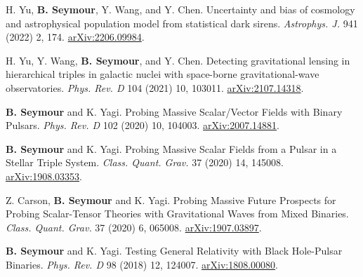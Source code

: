 \begin{cvpublications}
    \cvpublication
        {H. Yu, \textbf{B. Seymour}, Y. Wang, and Y. Chen. Uncertainty and bias of cosmology and astrophysical population model from statistical dark sirens.
        \textit{Astrophys. J.} 941 (2022) 2, 174.
        \href{https://arxiv.org/abs/2206.09984}{arXiv:2206.09984}.
        } %

    

\end{cvpublications}
\begin{cvpublications}
        \cvpublication
        {H. Yu, Y. Wang, \textbf{B. Seymour}, and Y. Chen. Detecting gravitational lensing in hierarchical triples in galactic nuclei with space-borne gravitational-wave observatories.
        \textit{Phys. Rev. D} 104 (2021) 10, 103011.
        \href{https://arxiv.org/abs/2107.14318}{arXiv:2107.14318}.
        } %

    \cvpublication
        {\textbf{B. Seymour} and K. Yagi. Probing Massive Scalar/Vector Fields with Binary Pulsars.
        \textit{Phys. Rev. D} 102 (2020) 10, 104003.
        \href{https://arxiv.org/abs/2007.14881}{arXiv:2007.14881}.
        } %
        

  \cvpublication
    {\textbf{B. Seymour} and K. Yagi. Probing Massive Scalar Fields from a Pulsar in a Stellar Triple System.
    \textit{Class. Quant. Grav.} 37 (2020) 14, 145008.
    \href{https://arxiv.org/abs/1908.03353}{arXiv:1908.03353}. } %
    
  \cvpublication
    {Z. Carson, \textbf{B. Seymour} and K. Yagi. Probing Massive Future Prospects for Probing Scalar-Tensor Theories with Gravitational Waves from Mixed Binaries. \textit{Class. Quant. Grav.} 37 (2020) 6, 065008. \href{https://arxiv.org/abs/1907.03897}{arXiv:1907.03897}. } %

  \cvpublication
    {\textbf{B. Seymour} and K. Yagi. Testing General Relativity with Black Hole-Pulsar Binaries. \textit{Phys. Rev. D} 98 (2018) 12, 124007. \href{https://arxiv.org/abs/1808.00080}{arXiv:1808.00080}.} %
\end{cvpublications}


